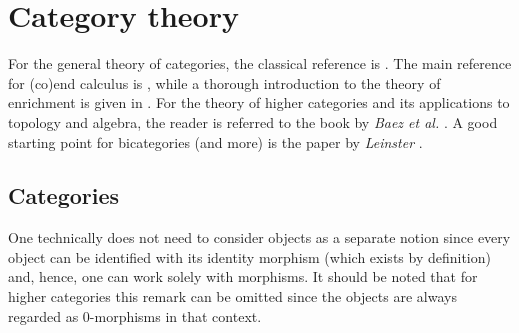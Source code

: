 \chapter{Category theory}\label{chapter:cat}

    For the general theory of categories, the classical reference is \cite{maclane}. The main reference for (co)end calculus is \cite{end}, while a thorough introduction to the theory of enrichment is given in \cite{kelly}. For the theory of higher categories and its applications to topology and algebra, the reader is referred to the book by \textit{Baez et al.} \cite{towards_higher_cat}. A good starting point for bicategories (and more) is the paper by \textit{Leinster} \cite{basic_bicategories}.

\section{Categories}

    \begin{remark}
        One technically does not need to consider objects as a separate notion since every object can be identified with its identity morphism (which exists by definition) and, hence, one can work solely with morphisms. It should be noted that for higher categories this remark can be omitted since the objects are always regarded as 0-morphisms in that context.
    \end{remark}

